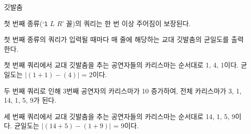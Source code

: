 \begin{problem}{깃발춤}
\begin{itemize}
    \end{itemize}
    첫 번째 종류(`\verb|1| $ L $ $ R $' 꼴)의 쿼리는 한 번 이상 주어짐이 보장된다.
    
    \OutputFile
    첫 번째 종류의 쿼리가 입력될 때마다 매 줄에 해당하는 교대 깃발춤의 균일도를 출력한다.
    
    \Examples
    
    \begin{example}
    \end{example}
    
    \Explanation
    
    첫 번째 쿼리에서 교대 깃발춤을 추는 공연자들의 카리스마는 순서대로 1, 4, 1이다. 균일도는 $ |(1 + 1) - (4)| $ = 2이다.
    
    두 번째 쿼리로 인해 3번째 공연자의 카리스마가 10 증가하여, 전체 카리스마가 3, 1, 14, 1, 5, 9가 된다.
    
    세 번째 쿼리에서 교대 깃발춤을 추는 공연자들의 카리스마는 순서대로 14, 1, 5, 9이다. 균일도는 $ |(14 + 5) - (1 + 9)| $ = 9이다.
    
\end{problem}

